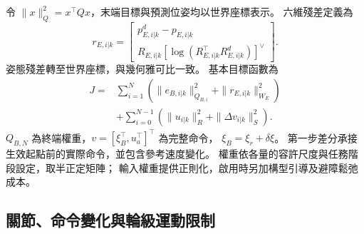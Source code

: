 令 $\|x\|_Q^2=x^\top Qx$，末端目標與預測位姿均以世界座標表示。
六維殘差定義為
\begin{equation}
    r_{E,i|k}=
    \begin{bmatrix}
        p_{E,i|k}^{d}-p_{E,i|k}\\
        R_{E,i|k}
        [\log(R_{E,i|k}^{\top}R_{E,i|k}^{d})]^\vee
    \end{bmatrix}.
    \label{eq:ch3_tcp_pose_residual}
\end{equation}
姿態殘差轉至世界座標，與幾何雅可比一致。
基本目標函數為
\begin{equation}
    \begin{aligned}
        J={}&\sum_{i=1}^{N}
        \left(\|e_{B,i|k}\|_{Q_{B,i}}^2+
              \|r_{E,i|k}\|_{W_E}^2\right)\\
        &+\sum_{i=0}^{N-1}
        \left(\|u_{i|k}\|_R^2+
              \|\Delta v_{i|k}\|_S^2\right).
    \end{aligned}
    \label{eq:ch3_wholebody_objective}
\end{equation}
$Q_{B,N}$ 為終端權重，$v=[\xi_B^\top,u_a^\top]^\top$ 為完整命令，
$\xi_B=\xi_r+\delta\xi$。
第一步差分承接生效起點前的實際命令，並包含參考速度變化。
權重依各量的容許尺度與任務階段設定，取半正定矩陣；
輸入權重提供正則化，啟用時另加構型引導及避障鬆弛成本。

\subsection{關節、命令變化與輪級運動限制}
\label{subsec:joint_command_wheel_constraints}

